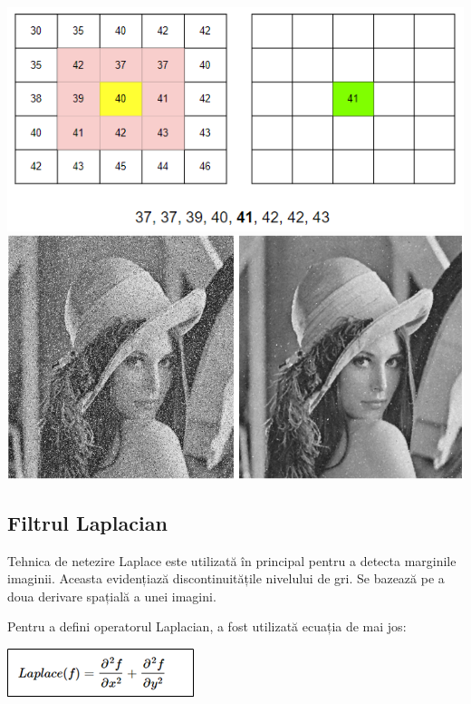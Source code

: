 \documentclass[10pt]{article}
\begin{document}
\begin{center}

  \includegraphics[scale=0.5]{filtru-median-masca}
  \includegraphics[scale=0.5]{filtru-median}

\end{center}

\newpage

\subsection{Filtrul Laplacian}

\> Tehnica de netezire Laplace este utilizată în principal pentru a detecta marginile imaginii.
Aceasta evidențiază discontinuitățile nivelului de gri. Se bazează pe a doua derivare spațială a unei imagini.

\> Pentru a defini operatorul Laplacian, a fost utilizată ecuația de mai jos:

\begin{center}

  \includegraphics[scale=0.5]{filtru-laplacian-ecuatie}

\end{center}
\end{document}
